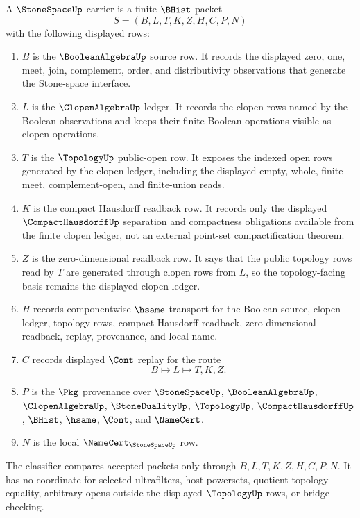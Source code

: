 \begin{definition}
\label{def:stone-space-carrier}
A $\StoneSpaceUp$ carrier is a finite $\BHist$ packet
$$
S=(B,L,T,K,Z,H,C,P,N)
$$
with the following displayed rows:
\begin{enumerate}
\item $B$ is the $\BooleanAlgebraUp$ source row. It records the displayed zero, one, meet, join, complement, order, and distributivity observations that generate the Stone-space interface.
\item $L$ is the $\ClopenAlgebraUp$ ledger. It records the clopen rows named by the Boolean observations and keeps their finite Boolean operations visible as clopen operations.
\item $T$ is the $\TopologyUp$ public-open row. It exposes the indexed open rows generated by the clopen ledger, including the displayed empty, whole, finite-meet, complement-open, and finite-union reads.
\item $K$ is the compact Hausdorff readback row. It records only the displayed $\CompactHausdorffUp$ separation and compactness obligations available from the finite clopen ledger, not an external point-set compactification theorem.
\item $Z$ is the zero-dimensional readback row. It says that the public topology rows read by $T$ are generated through clopen rows from $L$, so the topology-facing basis remains the displayed clopen ledger.
\item $H$ records componentwise $\hsame$ transport for the Boolean source, clopen ledger, topology rows, compact Hausdorff readback, zero-dimensional readback, replay, provenance, and local name.
\item $C$ records displayed $\Cont$ replay for the route
$$
B \longmapsto L \longmapsto T,K,Z .
$$
\item $P$ is the $\Pkg$ provenance over $\StoneSpaceUp$, $\BooleanAlgebraUp$, $\ClopenAlgebraUp$, $\StoneDualityUp$, $\TopologyUp$, $\CompactHausdorffUp$, $\BHist$, $\hsame$, $\Cont$, and $\NameCert$.
\item $N$ is the local $\NameCert_{\StoneSpaceUp}$ row.
\end{enumerate}
The classifier compares accepted packets only through $B,L,T,K,Z,H,C,P,N$. It has no coordinate for selected ultrafilters, host powersets, quotient topology equality, arbitrary opens outside the displayed $\TopologyUp$ rows, or bridge checking.
\end{definition}

